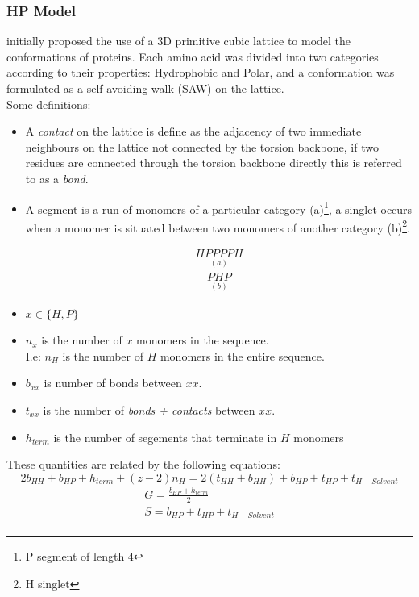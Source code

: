 \subsubsection{HP Model}
\cite{Yue} initially proposed the use of a 3D primitive cubic lattice to model the conformations
of proteins. Each amino acid was divided into two categories according to their properties:
Hydrophobic and Polar, and a conformation was formulated as a self avoiding walk (SAW) on the lattice.
\\ Some definitions:
\begin{itemize}
    \item A \emph{contact} on the lattice is define as the adjacency of two immediate neighbours on the lattice
    not connected by the torsion backbone, if two residues are connected 
    through the torsion backbone directly this is referred to 
    as a \emph{bond}.
    \item A segment is a run of monomers of a particular category (a)\footnote{P segment of length 4}, a singlet
          occurs when a monomer is situated between two monomers of another category (b)\footnote{H singlet}.

    \begin{multicols}{2}
        \noindent
        \begin{align*}
            \underset{(a)}{HPPPPH} 
        \end{align*}
        \begin{align*}
            \underset{(b)}{PHP}
        \end{align*}
    \end{multicols}
    \item $x \in \{H,P\}$
    \item $n_x$ is the number of $x$ monomers in the sequence. \\
        I.e: $n_H$ is the number of $H$ monomers in the entire sequence.
    \item $b_{xx}$ is number of bonds between $xx$.
    \item $t_{xx}$ is the number of \emph{bonds + contacts} between $xx$.
    \item $h_{term}$ is the number of segements that terminate in $H$ monomers
\end{itemize}
These quantities are related by the following equations:
\begin{equation}
    2b_{HH} + b_{HP} + h_{term} + (z-2)n_H = 2(t_{HH} + b_{HH}) + b_{HP} + t_{HP} + t_{H-Solvent}
\end{equation}
\begin{equation}
    \begin{gathered}
         G = \frac{b_{HP} + h_{term}}{2} \\
         S = b_{HP} + t_{HP} + t_{H-Solvent} \\
    \end{gathered}
\end{equation}
